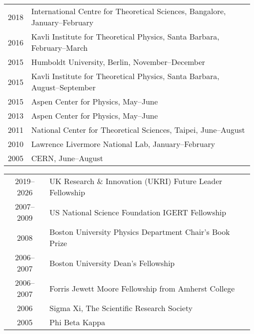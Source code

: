 \documentclass[10 pt]{article}
\renewcommand{\section}[2]%
    {\pagebreak[2]\vspace{1.3\baselineskip}%
     \hspace{0in}%
     \marginpar{
     \raggedright \scshape #1}#2}
\newcommand{\blankline}{\quad\pagebreak[2]}
\newcommand{\spacer}{\blankline\vspace{12 pt}\blankline}
\begin{document}
\vspace{-12 pt} %
\begin{tabular}[t]{cl}
  2018 & International Centre for Theoretical Sciences, Bangalore, January--February \\
  2016 & Kavli Institute for Theoretical Physics, Santa Barbara, February--March     \\
  2015 & Humboldt University, Berlin, November--December                             \\
  2015 & Kavli Institute for Theoretical Physics, Santa Barbara, August--September   \\
  2015 & Aspen Center for Physics, May--June                                         \\
  2013 & Aspen Center for Physics, May--June                                         \\
  2011 & National Center for Theoretical Sciences, Taipei, June--August              \\
  2010 & Lawrence Livermore National Lab, January--February                          \\
  2005 & CERN, June--August                                                          \\
\end{tabular}

\spacer



\section{Honors and awards} %

\vspace{-12 pt} %
\begin{tabular}[t]{cl}
  2019--2026  & UK Research \& Innovation (UKRI) Future Leader Fellowship \\
  2007--2009  & US National Science Foundation IGERT Fellowship           \\
     2008     & Boston University Physics Department Chair's Book Prize   \\
  2006--2007  & Boston University Dean's Fellowship                       \\
  2006--2007  & Forris Jewett Moore Fellowship from Amherst College       \\
     2006     & Sigma Xi, The Scientific Research Society                 \\
     2005     & Phi Beta Kappa                                            \\
\end{tabular}
\end{document}
